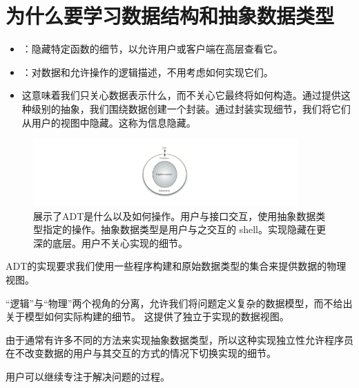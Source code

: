 \section{为什么要学习数据结构和抽象数据类型}

\begin{frame}\ft{\secname}
  \begin{itemize}
  \item {}：隐藏特定函数的细节，以允许用户或客户端在高层查看它。\\[0.1in] \pause 
  \item {}：对数据和允许操作的逻辑描述，不用考虑如何实现它们。
  \item[] 这意味着我们只关心数据表示什么，而不关心它最终将如何构造。通过提供这种级别的抽象，我们围绕数据创建一个封装。通过封装实现细节，我们将它们从用户的视图中隐藏。这称为信息隐藏。
  \end{itemize}

\end{frame}

\begin{frame}\ft{\secname}

\begin{figure}[htbp]
  \centering
  \includegraphics[width=4in]{images/ds_adt.png}
  \caption{展示了ADT是什么以及如何操作。用户与接口交互，使用抽象数据类型指定的操作。抽象数据类型是用户与之交互的 shell。实现隐藏在更深的底层。用户不关心实现的细节。}
\end{figure}
\end{frame}

\begin{frame}\ft{\secname}
  ADT的实现要求我们使用一些程序构建和原始数据类型的集合来提供数据的物理视图。

  “逻辑”与“物理”两个视角的分离，允许我们将问题定义复杂的数据模型，而不给出关于模型如何实际构建的细节。
  这提供了独立于实现的数据视图。


  由于通常有许多不同的方法来实现抽象数据类型，所以这种实现独立性允许程序员在不改变数据的用户与其交互的方式的情况下切换实现的细节。

  用户可以继续专注于解决问题的过程。
\end{frame}

